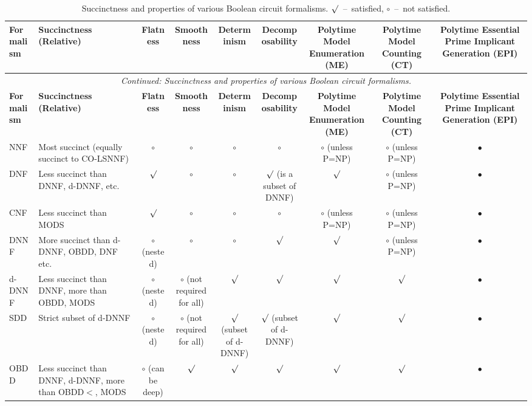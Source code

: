 \begin{longtable}{@{}l p{} c c c c c c c@{}}
\caption{Succinctness and properties of various Boolean circuit formalisms. $\surd$~--~satisfied, $\circ$~--~not satisfied.}%
\label{tbl:succinctness_properties}\\
\toprule
\textbf{Formalism} & \textbf{Succinctness (Relative)} & \textbf{Flatness} & \textbf{Smoothness} & \textbf{Determinism} & \textbf{Decomposability} & \textbf{Polytime Model Enumeration (ME)} & \textbf{Polytime Model Counting (CT)} & \textbf{Polytime Essential Prime Implicant Generation (EPI)} \\
\midrule
\endfirsthead

\multicolumn{9}{c}{\textit{Continued: Succinctness and properties of various Boolean circuit formalisms.}}\\
\toprule
\textbf{Formalism} & \textbf{Succinctness (Relative)} & \textbf{Flatness} & \textbf{Smoothness} & \textbf{Determinism} & \textbf{Decomposability} & \textbf{Polytime Model Enumeration (ME)} & \textbf{Polytime Model Counting (CT)} & \textbf{Polytime Essential Prime Implicant Generation (EPI)} \\
\midrule
\endhead

\endfoot
\bottomrule
\endlastfoot

NNF   & Most succinct (equally succinct to CO-LSNNF) & $\circ$ & $\circ$ & $\circ$ & $\circ$ & $\circ$ (unless P=NP) & $\circ$ (unless P=NP) & $\bullet$ \\
DNF   & Less succinct than DNNF, d-DNNF, etc.         & $\surd$ & $\circ$ & $\circ$ & $\surd$ (is a subset of DNNF) & $\surd$ & $\circ$ (unless P=NP) & $\bullet$ \\
CNF   & Less succinct than MODS                       & $\surd$ & $\circ$ & $\circ$ & $\circ$ & $\circ$ (unless P=NP) & $\circ$ (unless P=NP) & $\bullet$ \\
DNNF  & More succinct than d-DNNF, OBDD, DNF etc.     & $\circ$ (nested) & $\circ$ & $\circ$ & $\surd$ & $\surd$ & $\circ$ (unless P=NP) & $\bullet$ \\
d-DNNF& Less succinct than DNNF, more than OBDD, MODS & $\circ$ (nested) & $\circ$ (not required for all) & $\surd$ & $\surd$ & $\surd$ & $\surd$ & $\bullet$ \\
SDD   & Strict subset of d-DNNF                       & $\circ$ (nested) & $\circ$ (not required for all) & $\surd$ (subset of d-DNNF) & $\surd$ (subset of d-DNNF) & $\surd$ & $\surd$ & $\bullet$ \\
OBDD  & Less succinct than DNNF, d-DNNF, more than OBDD$<$, MODS & $\circ$ (can be deep) & $\surd$ & $\surd$ & $\surd$ & $\surd$ & $\surd$ & $\bullet$ \\

\end{longtable}